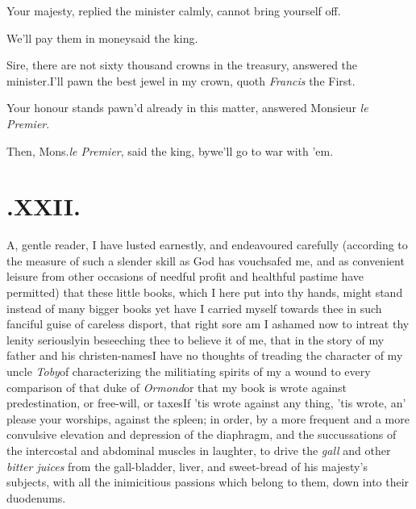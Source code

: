 \documentclass{article}
\begin{document}
Your majesty, replied the minister\break
calmly, cannot bring yourself off.

We’ll pay them in money\tsh said the king.

Sire, there are not sixty thousand\break
crowns in the treasury, answered the\break
minister.\tsh I’ll pawn the best jewel
in my crown, quoth \textit{Francis} the First.

Your honour stands pawn’d already\break
in this matter, answered Monsieur \textit{le Premier}.

Then, Mons.\@ \textit{le Premier}, said the king,
by\tsh we’ll go to war with ’em.

\baselineskip

\section{.\enspace XXII.}

\lettrine{A}{}, gentle reader, I have
lusted earnestly, and endeavoured
carefully (according to the measure of such a slender skill
as God has vouchsafed me, and as convenient leisure from
other occasions of needful profit and healthful pastime have
permitted) that these little books, which I here put into thy
hands,
might stand instead of many bigger books\break
\tsk yet have I
carried myself towards thee in such fanciful guise of
careless disport, that right sore am I ashamed now to
intreat thy lenity seriously\tsk in beseeching thee to
believe it of me, that in the story of my father and his
christen-\break names\tsk I have no thoughts of treading 
the character of my uncle \textit{Toby}\tsk of characterizing
the militiating spirits of my  a wound to every comparison of that 
duke of \textit{Ormond}\tsk or that my book is wrote against
predestination, or free-will, or taxes\tsk If ’tis wrote
against any thing,\break
\tsh ’tis wrote, an’ please your worships,
against the spleen; in order, by a more
frequent and a more convulsive elevation and depression of
the diaphragm, and the succussations of the intercostal and
abdominal muscles in laughter, to drive the \textit{gall}
and other \textit{bitter juices} from the gall-bladder,
liver, and sweet-bread of his majesty’s subjects, with all
the inimicitious passions which belong to them,\break
down into their duodenums.
\end{document}

